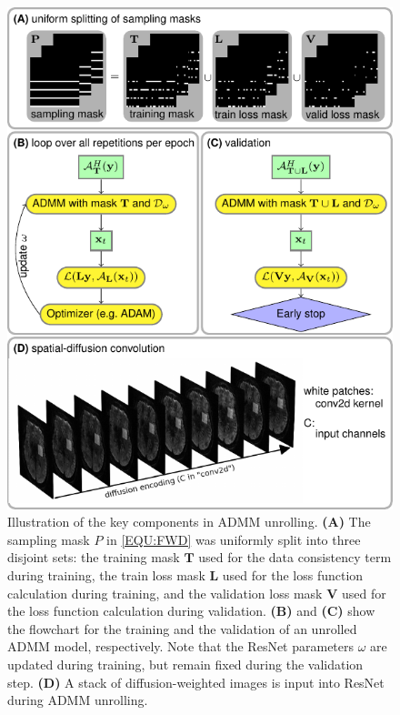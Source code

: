 \documentclass[journal,twoside,web]{ieeecolor}
\begin{document}
	\begin{figure}
		\centering
		\includegraphics[width=\columnwidth]{../figures/fig1.pdf}
		\caption{Illustration of the key components in ADMM unrolling.
			\textbf{(A)} The sampling mask $P$ in \cref{EQU:FWD} was
			uniformly split into three disjoint sets:
			the training mask $\mathbf{T}$ used for
			the data consistency term during training,
			the train loss mask $\mathbf{L}$ used for
			the loss function calculation during training, and
			the validation loss mask $\mathbf{V}$ used for
			the loss function calculation during validation.
			\textbf{(B)} and \textbf{(C)} show the flowchart
			for the training and the validation of an unrolled ADMM model, respectively.
			Note that the ResNet parameters $\omega$ are updated during training,
			but remain fixed during the validation step.
			\textbf{(D)} A stack of diffusion-weighted images 
			is input into ResNet during ADMM unrolling.}
		\label{FIG:ZSSSL}
	\end{figure}
\end{document}
